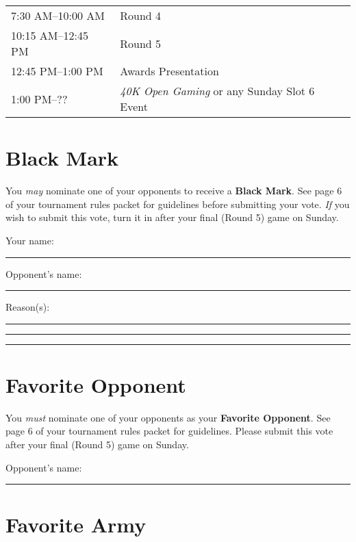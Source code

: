 \documentclass[12pt,titlepage]{article}
\newcommand{\dottedline}{\noindent\hdashrule{6.6in}{.5pt}{3pt 2pt}}
\begin{document}
\begin{tabular}[t]{@{}l@{\quad}l@{}}
\phantom{1}7:30 AM--10:00 AM & Round 4 \\
10:15 AM--12:45 PM & Round 5 \\
12:45 PM--1:00 PM & Awards Presentation \\
\phantom{1}1:00 PM--\phantom{10:}?? & \textit{40K Open Gaming} or any Sunday Slot 6 Event
\end{tabular}

\newpage

\pagestyle{empty}
\section*{Black Mark}

You \textit{may} nominate one of your opponents to receive a \textbf{Black Mark}. See page 6 of your tournament rules packet for guidelines before submitting your vote. \textit{If} you wish to submit this vote, turn it in after your final (Round 5) game on Sunday.

\vspace{24pt}

\noindent Your name: \rule{1.8in}{.5pt}\hspace{.5in}Opponent's name: \rule{1.8in}{.5pt}

\vspace{12pt}
\noindent Reason(s): \rule{5.7in}{.5pt}

\vspace{12pt}
\noindent\rule{6.5in}{.5pt}

\vspace{12pt}
\noindent\rule{6.5in}{.5pt}

\vspace{12pt}
\dottedline

\section*{Favorite Opponent}

You \textit{must} nominate one of your opponents as your \textbf{Favorite Opponent}. See page 6 of your tournament rules packet for guidelines. Please submit this vote after your final (Round 5) game on Sunday.

\vspace{12pt}
\noindent Opponent's name: \rule{5.25in}{.5pt}

\vspace{108pt}
\dottedline

\section*{Favorite Army}
\end{document}
